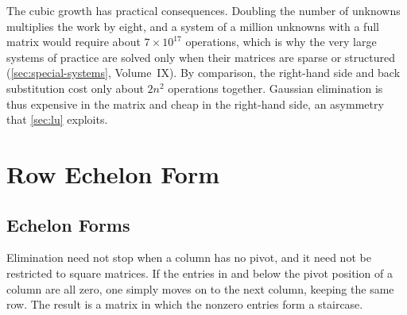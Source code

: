 \begin{table}
\end{table}

The cubic growth has practical consequences. Doubling the number of unknowns multiplies the work by eight, and a system of a million unknowns with a full matrix would require about $7\times10^{17}$ operations, which is why the very large systems of practice are solved only when their matrices are sparse or structured (\cref{sec:special-systems}, Volume~IX). By comparison, the right-hand side and back substitution cost only about $2n^2$ operations together. Gaussian elimination is thus expensive in the matrix and cheap in the right-hand side, an asymmetry that \cref{sec:lu} exploits.
\section{Row Echelon Form}
\label{sec:echelon}

\subsection{Echelon Forms}

Elimination need not stop when a column has no pivot, and it need not be restricted to square matrices. If the entries in and below the pivot position of a column are all zero, one simply moves on to the next column, keeping the same row. The result is a matrix in which the nonzero entries form a staircase.

